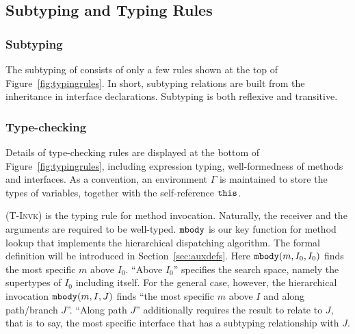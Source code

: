 \subsection{Subtyping and Typing Rules}\label{subsec:typingrules}
\subsubsection{Subtyping}
The subtyping of \MIM{} consists of only a few rules shown at the top of Figure~\ref{fig:typingrules}.
In short, subtyping relations are built from the inheritance in interface
declarations. Subtyping is both reflexive and transitive.

\subsubsection{Type-checking}
Details of type-checking rules are displayed at the bottom of Figure~\ref{fig:typingrules}, including expression
typing, well-formedness of methods and interfaces. As a convention, an environment
$\Gamma$ is maintained to store the types of variables, together with
the self-reference $\texttt{this}$.

\textsc{(T-Invk)} is the typing rule for method invocation.
Naturally, the receiver and the arguments are required to be well-typed.
$\texttt{mbody}$ is our key function for method lookup that implements the
hierarchical dispatching algorithm. The formal definition will be introduced in Section~\ref{sec:auxdefs}.
Here $\texttt{mbody}(m, I_0, I_0)$ finds the most specific $m$ above $I_0$. ``Above $I_0$'' specifies
the search space, namely the supertypes of $I_0$ including itself.
For the general case, however, the hierarchical invocation $\texttt{mbody}(m, I, J)$ finds ``the most specific $m$
above $I$ and along path/branch $J$''. ``Along path $J$'' additionally requires the result to relate to $J$, that is to say,
the most specific interface that has a subtyping relationship with $J$.

